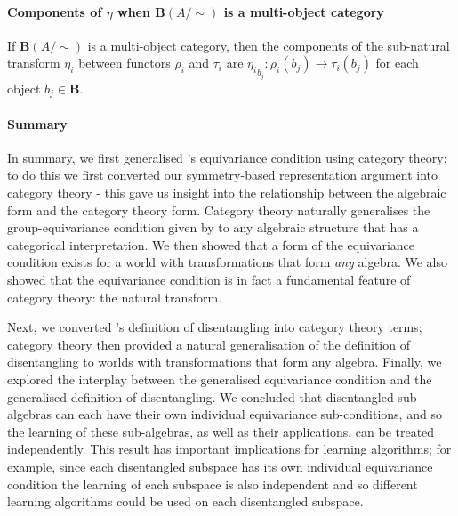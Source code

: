 \paragraph{Components of $\eta$ when $\textbf{B}(A/\sim)$ is a multi-object category}

If $\textbf{B}(A/\sim)$ is a multi-object category, then the components of the sub-natural transform $\eta_{i}$ between functors $\rho_{i}$ and $\tau_{i}$ are ${\eta_{i}}_{b_{j}}: \rho_{i}(b_{j}) \to \tau_{i}(b_{j})$ for each object $b_{j} \in \textbf{B}$.



\paragraph{Summary}
In summary, we first generalised \autocite{Higgins2018}'s equivariance condition using category theory; to do this we first converted our symmetry-based representation argument into category theory - this gave us insight into the relationship between the algebraic form and the category theory form.
Category theory naturally generalises the group-equivariance condition given by \autocite{Higgins2018} to any algebraic structure that has a categorical interpretation.
We then showed that a form of the equivariance condition exists for a world with transformations that form \textit{any} algebra.
We also showed that the equivariance condition is in fact a fundamental feature of category theory: the natural transform.

Next, we converted \autocite{Higgins2018}'s definition of disentangling into category theory terms; category theory then provided a natural generalisation of the definition of disentangling to worlds with transformations that form any algebra.
Finally, we explored the interplay between the generalised equivariance condition and the generalised definition of disentangling.
We concluded that disentangled sub-algebras can each have their own individual equivariance sub-conditions, and so the learning of these sub-algebras, as well as their applications, can be treated independently.
This result has important implications for learning algorithms; for example, since each disentangled subspace has its own individual equivariance condition the learning of each subspace is also independent and so different learning algorithms could be used on each disentangled subspace.

